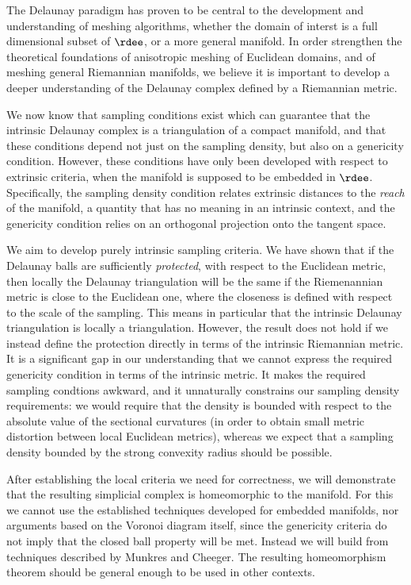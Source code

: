 
%

The Delaunay paradigm has proven to be central to the development and
understanding of meshing algorithms, whether the domain of interst is
a full dimensional subset of $\rdee$, or a more general manifold. In
order strengthen the theoretical foundations of anisotropic meshing of
Euclidean domains, and of meshing general Riemannian manifolds, we
believe it is important to develop a deeper understanding of the
Delaunay complex defined by a Riemannian metric. 

We now know that sampling conditions exist which can guarantee that
the intrinsic Delaunay complex is a triangulation of a compact
manifold, and that these conditions depend not just on the sampling
density, but also on a genericity condition. However, these conditions
have only been developed with respect to extrinsic criteria, when the
manifold is supposed to be embedded in $\rdee$. Specifically, the
sampling density condition relates extrinsic distances to the
\emph{reach} of the manifold, a quantity that has no meaning in an
intrinsic context, and the genericity condition relies on an
orthogonal projection onto the tangent space. 

We aim to develop purely intrinsic sampling criteria. We have shown
that if the Delaunay balls are sufficiently \emph{protected}, with
respect to the Euclidean metric, then locally the Delaunay
triangulation will be the same if the Riemenannian metric is close to
the Euclidean one, where the closeness is defined with respect to the
scale of the sampling. This means in particular that the intrinsic
Delaunay triangulation is locally a triangulation. However, the result
does not hold if we instead define the protection directly in terms of
the intrinsic Riemannian metric. It is a significant gap in our
understanding that we cannot express the required genericity condition
in terms of the intrinsic metric. It makes the required sampling
condtions awkward, and it unnaturally constrains our sampling density
requirements: we would require that the density is bounded with
respect to the absolute value of the sectional curvatures (in order to
obtain small metric distortion between local Euclidean metrics),
whereas we expect that a sampling density bounded by the strong
convexity radius should be possible.

After establishing the local criteria we need for correctness, we will
demonstrate that the resulting simplicial complex is homeomorphic to
the manifold. For this we cannot use the established techniques
developed for embedded manifolds, nor arguments based on the Voronoi
diagram itself, since the genericity criteria do not imply that the
closed ball property will be met. Instead we will build from techniques
described by Munkres and Cheeger. The resulting homeomorphism theorem
should be general enough to be used in other contexts.


